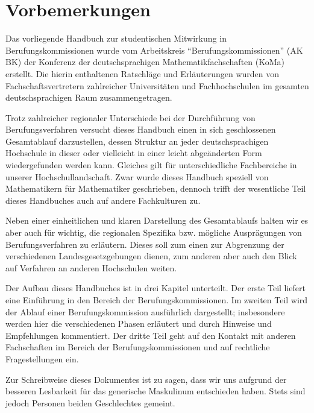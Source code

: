 \documentclass[10pt,twoside,a5paper,openright]{book}
\begin{document}
\newpage
\tableofcontents\thispagestyle{fancy}



\chapter*{Vorbemerkungen}\thispagestyle{fancy}

Das vorliegende Handbuch zur studentischen Mitwirkung in Berufungskommissionen wurde vom Arbeitskreis "`Berufungskommissionen"' (AK BK) der Konferenz der deutschsprachigen Mathematikfachschaften (KoMa) erstellt. Die hierin enthaltenen Ratschläge und Erläuterungen wurden von Fachschaftsvertretern zahlreicher Universitäten und Fachhochschulen im gesamten deutschsprachigen Raum zusammengetragen. 

Trotz zahlreicher regionaler Unterschiede bei der Durchführung von Berufungsverfahren versucht dieses Handbuch einen in sich geschlossenen Gesamtablauf darzustellen, dessen Struktur an jeder deutschsprachigen Hochschule in dieser oder vielleicht in einer leicht abgeänderten Form wiedergefunden werden kann. Gleiches gilt für unterschiedliche Fachbereiche in unserer Hochschullandschaft. Zwar wurde dieses Handbuch speziell von Mathematikern für Mathematiker geschrieben, dennoch trifft der wesentliche Teil dieses Handbuches auch auf andere Fachkulturen zu.

Neben einer einheitlichen und klaren Darstellung des Gesamtablaufs halten wir es aber auch für wichtig, die regionalen Spezifika bzw. mögliche Ausprägungen von Berufungsverfahren zu erläutern. Dieses soll zum einen zur Abgrenzung der verschiedenen Landesgesetzgebungen dienen, zum anderen aber auch den Blick auf Verfahren an anderen Hochschulen weiten.

Der Aufbau dieses Handbuches ist in drei Kapitel unterteilt. Der erste Teil liefert eine Einführung in den Bereich der Berufungskommissionen. Im zweiten Teil wird der Ablauf einer Berufungskommission ausführlich dargestellt; insbesondere werden hier die verschiedenen Phasen erläutert und durch Hinweise und Empfehlungen kommentiert. Der dritte Teil geht auf den Kontakt mit anderen Fachschaften im Bereich der Berufungskommissionen und auf rechtliche Fragestellungen ein.

Zur Schreibweise dieses Dokumentes ist zu sagen, dass wir uns aufgrund der besseren Lesbarkeit für das generische Maskulinum entschieden haben. Stets sind jedoch Personen beiden Geschlechtes gemeint.
\end{document}

